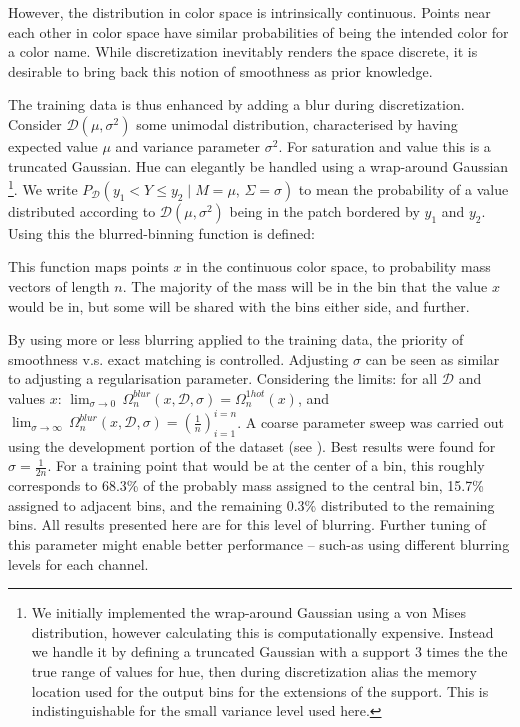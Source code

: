 \documentclass[11pt,letterpaper]{article}
\newcommand{\compactmath}[1]{\noindent\resizebox{\columnwidth}{!}{$#1$}}
\begin{document}
However, the distribution in color space is intrinsically continuous.
Points near each other in color space have similar probabilities of being the intended color for a color name.
While discretization inevitably renders the space discrete, it is desirable to bring back this notion of smoothness as prior knowledge.

The training data is thus enhanced by adding a blur during discretization.
Consider $\mathcal{D}(\mu,\sigma^{2})$ some unimodal distribution, characterised by having expected value $\mu$ and variance parameter $\sigma^{2}$.
For saturation and value this is a truncated Gaussian.
Hue can elegantly be handled using a wrap-around Gaussian%
\footnote{We initially implemented the wrap-around Gaussian using 
 a von Mises distribution, however calculating this is computationally expensive.
Instead we handle it by defining a truncated Gaussian with a support 3 times the the true range of values for hue, then during discretization alias the memory location used for the output bins for the extensions of the support.
This is indistinguishable for the small variance level used here.}.
We write $P_{\mathcal{D}}(y_{1}<Y\le y_{2}\mid M=\mu,\,\Sigma=\sigma)$ to mean the probability of a value distributed according to $\mathcal{D}(\mu,\sigma^{2})$ being in the patch bordered by $y_1$ and $y_2$.
Using this the blurred-binning function is defined: 

\compactmath{\Omega_{n}^{blur}(x,\mathcal{D},\sigma)=\left(P_{\mathcal{D}}\left(\dfrac{i-1}{n}<Y\le\dfrac{i}{n}\mid M=x,\,\Sigma=\sigma\right)\right)_{i=1}^{i=n}}
This function maps points $x$ in the continuous color space, to probability mass vectors of length $n$.
The majority of the mass will be in the bin that the value $x$ would be in,
but some will be shared with the bins either side, and further.

By using more or less blurring applied to the training data, the priority of smoothness v.s. exact matching is controlled.
Adjusting $\sigma$ can be seen as similar to adjusting a regularisation parameter.
Considering the limits:
for all $\mathcal{D}$ and values $x$: 
\mbox{$\lim_{\sigma \to 0}\, \Omega_n^{blur}(x, \mathcal{D}, \sigma) = \Omega_n^{1hot}(x)$},
and \mbox{$\lim_{\sigma \to \infty}\, \Omega_n^{blur}(x, \mathcal{D}, \sigma) =  \left(\frac{1}{n}\right)_{i=1}^{i=n}$}.
A coarse parameter sweep was carried out using the development portion of the dataset (see ).
Best results were found for $\sigma = \frac{1}{2n}$.
For a training point that would be at the center of a bin, this roughly corresponds to 68.3\% of the probably mass assigned to the central bin, 15.7\% assigned to adjacent bins, and the remaining 0.3\% distributed to the remaining bins.
All results presented here are for this level of blurring.
Further tuning of this parameter might enable better performance -- such-as using different blurring levels for each channel.
\end{document}
